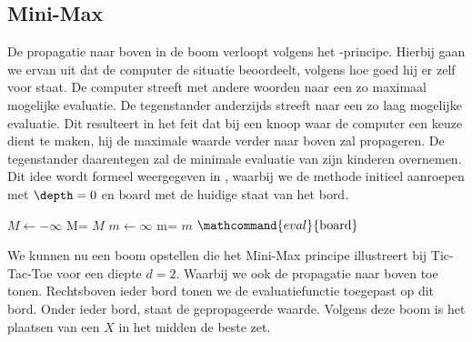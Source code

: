 \subsection{Mini-Max}
De propagatie naar boven in de boom verloopt volgens het -principe. Hierbij gaan we ervan uit dat de computer de situatie beoordeelt, volgens hoe goed hij er zelf voor staat. De computer streeft met andere woorden naar een zo maximaal mogelijke evaluatie. De tegenstander anderzijds streeft naar een zo laag mogelijke evaluatie. Dit resulteert in het feit dat bij een knoop waar de computer een keuze dient te maken, hij de maximale waarde verder naar boven zal propageren. De tegenstander daarentegen zal de minimale evaluatie van zijn kinderen overnemen. Dit idee wordt formeel weergegeven in , waarbij we de methode initieel aanroepen met $\depth=0$ en $\mbox{board}$ met de huidige staat van het bord.
\begin{algorithm}[htb]
\caption{$\mathcommand{minimax}{\mbox{board},\depth}$}
\label{alg:minimax}
\begin{algorithmic}[1]
\IF{$\depth<\depthbound$}
\STATE{}
\STATE$M\leftarrow-\infty$
\STATE M=
\ENDFOR
\RETURN $M$
\ELSE
\STATE$m\leftarrow\infty$
\STATE m=
\ENDFOR
\RETURN $m$
\ENDIF
\ELSE
\STATE{}
\RETURN $\mathcommand{eval}{\mbox{board}}$
\ENDIF
\end{algorithmic}
\end{algorithm}
\begin{leftbar}
We kunnen nu een boom opstellen die het Mini-Max principe illustreert bij Tic-Tac-Toe voor een diepte $d=2$. Waarbij we ook de propagatie naar boven toe tonen. Rechtsboven ieder bord tonen we de evaluatiefunctie toegepast op dit bord. Onder ieder bord, staat de gepropageerde waarde. Volgens deze boom is het plaatsen van een $X$ in het midden de beste zet.
\end{leftbar}
